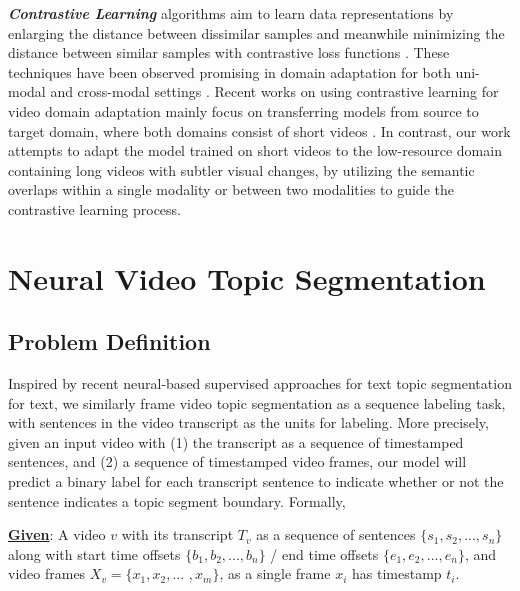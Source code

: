 \documentclass[runningheads]{llncs}
\begin{document}
\vspace{1ex}
\noindent
\textbf{\textit{Contrastive Learning}} algorithms aim to learn data representations by enlarging the distance between dissimilar samples and meanwhile minimizing the distance between similar samples with contrastive loss functions \cite{Oord2018RepresentationLW}. These techniques have been observed promising in domain adaptation for both uni-modal and cross-modal settings \cite{kang2019contrastive,Kim2021LearningCC,chen2022contrastive}. Recent works on using contrastive learning for video domain adaptation mainly focus on transferring models from source to target domain, where both domains consist of short videos \cite{Kim2021LearningCC}. In contrast, our work attempts to adapt the model trained on short videos to the low-resource domain containing long videos with subtler %
visual changes, by utilizing the semantic overlaps within a single modality or between two modalities to guide the contrastive learning process.

\vspace{-2ex}
\section{Neural Video Topic Segmentation}
\label{sec:seg_model}
\vspace{-1ex}
\subsection{Problem Definition}

Inspired by recent neural-based supervised approaches for text topic segmentation for text, we similarly frame video topic segmentation as a sequence labeling task, with sentences in the video transcript as the units for labeling. More precisely, given an input video with (1) the transcript as a sequence of timestamped sentences, and (2) a sequence of timestamped video frames, our model will predict a binary label for each transcript sentence to indicate whether or not the sentence indicates a topic segment boundary. Formally,

\vspace{1ex}
\noindent
\textbf{\underline{Given}}: A video $v$ with its transcript $T_v$ %
as a sequence of sentences $\{ s_1, s_2, ... , s_n \}$ along %
with start time offsets $\{ b_1, b_2, ... , b_n \}$ / end time offsets $\{ e_1, e_2, ... , e_n \}$, and video frames $X_v = \{ x_1, x_2, ...$ $ , x_m \}$, as a single frame $x_i$ has timestamp $t_i$.
\end{document}
